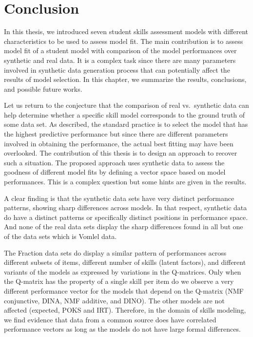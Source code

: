 \label{sec:Conclusion}

\section{Conclusion}
In this thesis, we introduced seven student skills assessment models with different characteristics to be used to assess model fit. The main contribution is to assess model fit of a student model with comparison of the model performances over synthetic and real data. It is a complex task since there are many parameters involved in synthetic data generation process that can potentially affect the results of model selection. In this chapter, we summarize the results, conclusions, and possible future works.



Let us return to the conjecture that the comparison of real vs.\ synthetic data can help determine whether a specific skill model corresponds to the ground truth of some data set. As described, the standard practice is to select the model that has the highest predictive performance but since there are different parameters involved in obtaining the performance, the actual best fitting may have been overlooked. The contribution of this thesis is to design an approach to recover such a situation. The proposed approach uses synthetic data to assess the goodness of different model fits by defining a vector space based on model performances. This is a complex question but some hints are given in the results.  

A clear finding is that the synthetic data sets have very distinct performance patterns, showing sharp differences across models.  In that respect, synthetic data do have a distinct patterns or specifically distinct positions in performance space. And none of the real data sets display the sharp differences found in all but one of the data sets which is Vomlel data.  

The Fraction data sets do display a similar pattern of performances across different subsets of items, different number of skills (latent factors), and different variants of the models as expressed by variations in the Q-matrices. Only when the Q-matrix has the property of a single skill per item do we observe a very different performance vector for the models that depend on the Q-matrix (NMF conjunctive, DINA, NMF additive, and DINO).  The other models are not affected (expected, POKS and IRT).  Therefore, in the domain of skills modeling, we find evidence that data from a common source does have correlated performance vectors as long as the models do not have large formal differences.

